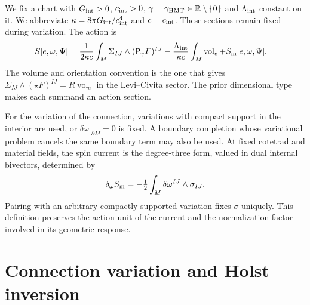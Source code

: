 \begin{HMTCompactSection}
We fix a chart with \(G_{\rm int}>0\), \(c_{\rm int}>0\),
\(\gamma=\gamma_{\rm HMT}\in\mathbb R\setminus\{0\}\) and
\(\Lambda_{\rm int}\) constant on it. We abbreviate
\(\kappa=8\pi G_{\rm int}/c_{\rm int}^4\) and \(c=c_{\rm int}\).
These sections remain fixed during variation. The action is
\begin{equation}
 \begin{split}
 S[e,\omega,\Psi]={}&
 \frac1{2\kappa c}\int_M\Sigma_{IJ}\wedge
                         (\mathsf P_\gamma F)^{IJ}
 -\frac{\Lambda_{\rm int}}{\kappa c}
                         \int_M\operatorname{vol}_e
 +S_{\rm m}[e,\omega,\Psi].
 \end{split}
 \label{x_reciprocidad:vii:eq:accion-cartan-holst}
\end{equation}
The volume and orientation convention is the one that gives \(\Sigma_{IJ}\wedge(\star F)^{IJ}=R\operatorname{vol}_e\) in the Levi--Civita sector. The prior dimensional type makes each summand an action section.

For the variation of the connection, variations with compact support in the interior are used, or \(\delta\omega|_{\partial M}=0\) is fixed. A boundary completion whose variational problem cancels the same boundary term may also be used. At fixed cotetrad and material fields, the spin current is the degree-three form, valued in dual internal bivectors, determined by
\begin{equation}
 \delta_\omega S_{\rm m}
 =-\tfrac12\int_M\delta\omega^{IJ}\wedge\sigma_{IJ}.
 \label{x_reciprocidad:vii:eq:corriente-variacional}
\end{equation}
Pairing with an arbitrary compactly supported variation fixes \(\sigma\) uniquely. This definition preserves the action unit of the current and the normalization factor involved in its geometric response.

\section{Connection variation and Holst inversion}
\label{x_reciprocidad:vii:subsec:variacion-holst}


\end{HMTCompactSection}
